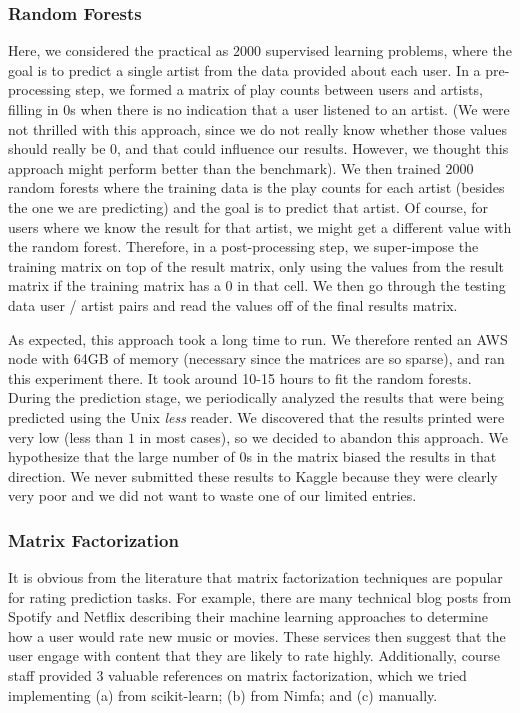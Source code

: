 \documentclass[10pt]{article}
\begin{document}
\subsubsection{Random Forests}
Here, we considered the practical as $2000$ supervised learning problems, where the goal is to predict a single artist from the data provided about each user. In a pre-processing step, we formed a matrix of  play counts between users and artists, filling in $0$s when there is no indication that a user listened to an artist. (We were not thrilled with this approach, since we do not really know whether those values should really be $0$, and that could influence our results. However, we thought this approach might perform better than the benchmark). We then trained $2000$ random forests where the training data is the play counts for each artist (besides the one we are predicting) and the goal is to predict that artist. Of course, for users where we know the result for that artist, we might get a different value with the random forest. Therefore, in a post-processing step, we super-impose the training matrix on top of the result matrix, only using the values from the result matrix if the training matrix has a $0$ in that cell. We then go through the testing data user / artist pairs and read the values off of the final results matrix.

As expected, this approach took a long time to run. We therefore rented an AWS node with 64GB of memory (necessary since the matrices are so sparse), and ran this experiment there. It took around 10-15 hours to fit the random forests. During the prediction stage, we periodically analyzed the results that were being predicted using the Unix {\it less} reader. We discovered that the results printed were very low (less than $1$ in most cases), so we decided to abandon this approach. We hypothesize that the large number of $0$s in the matrix biased the results in that direction. We never submitted these results to Kaggle because they were clearly very poor and we did not want to waste one of our limited entries.

\subsubsection{Matrix Factorization}
It is obvious from the literature that matrix factorization techniques are popular for rating prediction tasks. For example, there are many technical blog posts from Spotify and Netflix describing their machine learning approaches to determine how a user would rate new music or movies. These services then suggest that the user engage with content that they are likely to rate highly. Additionally, course staff provided $3$ valuable references on matrix factorization, which we tried implementing (a) from scikit-learn; (b) from Nimfa; and (c) manually.
\end{document}
